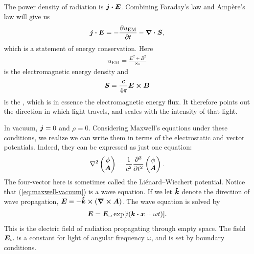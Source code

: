The power density of radiation is $\vb*{j} \vdot \vb*{E}$. Combining Faraday's law and Ampère's law will give us
\begin{align}
    \vb*{j} \vdot \vb*{E} = -\pdv{u_\text{EM}}{t} - \div{\vb*{S}},
\end{align}
which is a statement of energy conservation. Here
\begin{align}
    u_\text{EM} = \frac{E^2 + B^2}{8\pi}
\end{align}
is the electromagnetic energy density and
\begin{align} \label{eq:poynting}
    \vb*{S} = \frac{c}{4\pi} \vb*{E} \cp \vb*{B}
\end{align}
is the , which is in essence the electromagnetic energy flux. It therefore points out the direction in which light travels, and scales with the intensity of that light.

In vacuum, $\vb*{j} = 0$ and $\rho = 0$. Considering Maxwell's equations under these conditions, we realize we can write them in terms of the electrostatic and vector potentials. Indeed, they can be expressed as just one equation:
\begin{align} \label{eq:maxwell-vacuum}
    \laplacian{\begin{pmatrix} \phi \\ \vb*{A} \end{pmatrix}} = \frac{1}{c^2} \pdv[2]{t} \begin{pmatrix} \phi \\ \vb*{A} \end{pmatrix}.
\end{align}
The four-vector here is sometimes called the Liénard--Wiechert potential. Notice that (\ref{eq:maxwell-vacuum}) is a wave equation. If we let $\vu*{k}$ denote the direction of wave propagation, $\vb*{E} = -\vu*{k} \cp (\curl{\vb*{A}})$. The wave equation is solved by
\begin{align}
    \vb*{E} = \vb*{E}_\omega \exp[i(\vb*{k} \vdot \vb*{x} \pm \omega t)].
\end{align}
This is the electric field of radiation propagating through empty space. The field $\vb*{E}_\omega$ is a constant for light of angular frequency $\omega$, and is set by boundary conditions.

